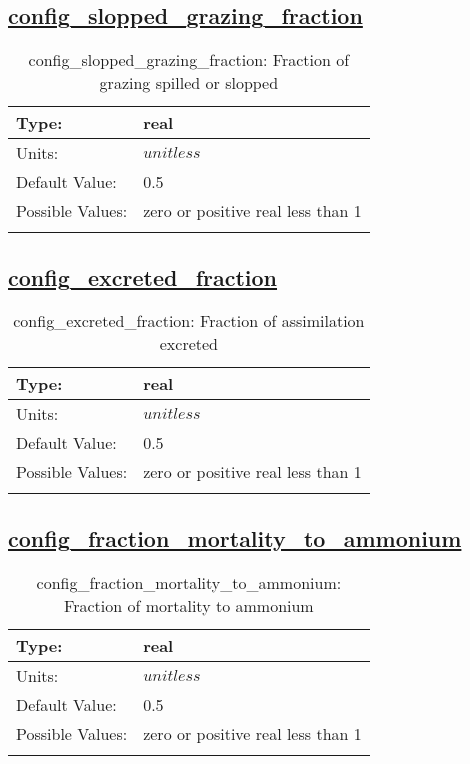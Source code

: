 \subsection[config\_slopped\_grazing\_fraction]{\hyperref[sec:nm_tab_biogeochemistry]{config\_slopped\_grazing\_fraction}}
\label{subsec:nm_sec_config_slopped_grazing_fraction}
\begin{center}
\begin{longtable}{| p{2.0in} || p{4.0in} |}
    \hline
    Type: & real \\
    \hline
    Units: & $unitless$ \\
    \hline
    Default Value: & 0.5 \\
    \hline
    Possible Values: & zero or positive real less than 1 \\
    \hline
    \caption{config\_slopped\_grazing\_fraction: Fraction of grazing spilled or slopped}
\end{longtable}
\end{center}
\subsection[config\_excreted\_fraction]{\hyperref[sec:nm_tab_biogeochemistry]{config\_excreted\_fraction}}
\label{subsec:nm_sec_config_excreted_fraction}
\begin{center}
\begin{longtable}{| p{2.0in} || p{4.0in} |}
    \hline
    Type: & real \\
    \hline
    Units: & $unitless$ \\
    \hline
    Default Value: & 0.5 \\
    \hline
    Possible Values: & zero or positive real less than 1 \\
    \hline
    \caption{config\_excreted\_fraction: Fraction of assimilation excreted}
\end{longtable}
\end{center}
\subsection[config\_fraction\_mortality\_to\_ammonium]{\hyperref[sec:nm_tab_biogeochemistry]{config\_fraction\_mortality\_to\_ammonium}}
\label{subsec:nm_sec_config_fraction_mortality_to_ammonium}
\begin{center}
\begin{longtable}{| p{2.0in} || p{4.0in} |}
    \hline
    Type: & real \\
    \hline
    Units: & $unitless$ \\
    \hline
    Default Value: & 0.5 \\
    \hline
    Possible Values: & zero or positive real less than 1 \\
    \hline
    \caption{config\_fraction\_mortality\_to\_ammonium: Fraction of mortality to ammonium}
\end{longtable}
\end{center}
